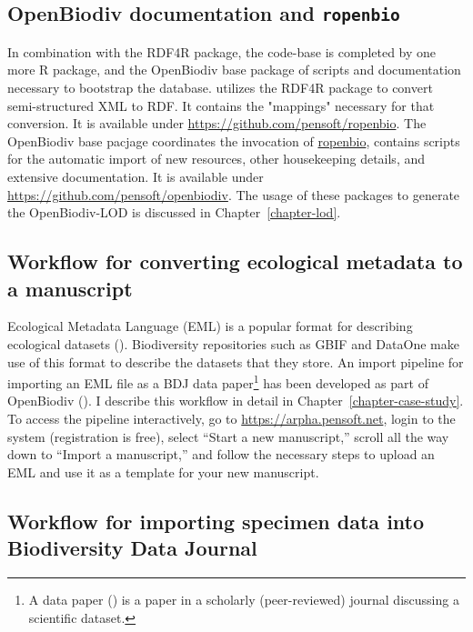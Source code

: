 \subsection{OpenBiodiv documentation and {\tt ropenbio}}

In combination with the RDF4R package, the code-base is completed by one more R package,  and the OpenBiodiv base package of scripts and documentation necessary to bootstrap the database.  utilizes the RDF4R package to convert semi-structured XML to RDF. It contains the "mappings" necessary for that conversion. It is available under \url{https://github.com/pensoft/ropenbio}. The OpenBiodiv base pacjage coordinates the invocation of \url{ropenbio}, contains scripts for the automatic import of new resources, other housekeeping details, and extensive documentation. It is available under \url{https://github.com/pensoft/openbiodiv}. The usage of these packages to generate the OpenBiodiv-LOD is discussed in Chapter~\ref{chapter-lod}.

\subsection{Workflow for converting ecological metadata to a manuscript}  

Ecological Metadata Language (EML) is a popular format for describing ecological datasets (\cite{michener_nongeospatial_1997}). Biodiversity repositories such as GBIF and DataOne make use of this format to describe the datasets that they store. An import pipeline for importing an EML file as a BDJ data paper\footnote{A data paper (\cite{chavan_data_2011}) is a paper in a scholarly (peer-reviewed) journal discussing a scientific dataset.} has been developed as part of OpenBiodiv (\cite{senderov_online_2016}). I describe this workflow in detail in Chapter~\ref{chapter-case-study}. To access the pipeline interactively, go to \url{https://arpha.pensoft.net}, login to the system (registration is free), select ``Start a new manuscript,'' scroll all the way down to ``Import a manuscript,'' and follow the necessary steps to upload an EML and use it as a template for your new manuscript.

\subsection{Workflow for importing specimen data into Biodiversity Data Journal}

